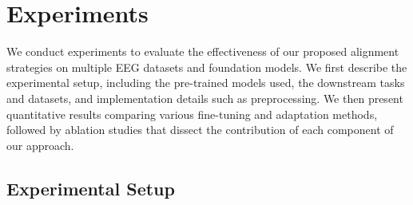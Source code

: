 \documentclass{article} %
\begin{document}
\section{Experiments}
We conduct experiments to evaluate the effectiveness of our proposed alignment strategies on multiple EEG datasets and foundation models. We first describe the experimental setup, including the pre-trained models used, the downstream tasks and datasets, and implementation details such as preprocessing. We then present quantitative results comparing various fine-tuning and adaptation methods, followed by ablation studies that dissect the contribution of each component of our approach.

\subsection{Experimental Setup}
\end{document}
